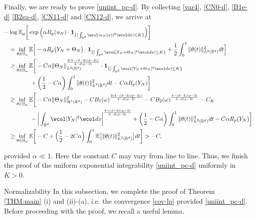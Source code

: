 \documentclass[%
11pt,  reqno]{amsart}
\makeatletter
\theoremstyle{remarkstyle}
\newcommand{\1}{\hspace{0.2mm}\text{I}\hspace{0.2mm}}
\newcommand{\noi}{\noindent}
\newcommand{\R}{\mathbb{R}}
\newcommand{\E}{\mathbb{E}}
\newcommand{\al}{\alpha}
\newcommand{\wick}[1]{\wcol#1\wcol}
\renewcommand{\o}{\omega}
\newcommand{\ind}{\mathbf 1}
\numberwithin{equation}{section}
\numberwithin{theorem}{section}
\def\subsubsection{\@startsection{subsubsection}{3}%
	\z@{.5\linespacing\@plus.7\linespacing}{-.5em}%
	{\normalfont\bfseries}}
\makeatother
\begin{document}
	
	Finally,
	we are ready to prove \eqref{uniint_pc-d}.
	By collecting \eqref{var4}, \eqref{CN0-d}, 
	\eqref{B1e-d}
	\eqref{B2ea-d},
	\eqref{CN11-d} and \eqref{CN12-d},
	we arrive at
	\begin{align}
		\label{CN13-d}
		\begin{split}
			- & \log  \E_{\mu}  \bigg[ \exp \Big(\al R_p(u_N) \cdot  \ind_{\{ | \int_{\R^d} \wick{|u_N (x)|^2} dx| \le K\}} \Big) \bigg] \\
			&= \inf_{\theta \in \mathbb{H}_a} \E \Big[ - \al R_p \big( Y_N+ \Theta_N \big) 
			\cdot  \ind_{\{ | \int_{\R^d} \wick{| Y_N  + \Theta_N|^2} dx|  \le K \}} + \frac12 \int_0^1 
			\| \theta (t) \|_{L^2(\R^d)}^2 dt  \Big] \\
			& \ge \inf_{\theta \in \mathbb{H}_a} \E \bigg[ - C \al  \|\Theta_N\|_{L^2(\R^d)}^{\frac{2(4-(d-2)(p-2))}{4-d(p-2)}} \cdot \ind_{\{ | \int_{\R^d} \wick{|Y_N + \Theta_N|^2} dx | \le K  \}} \\ 
			& \hphantom{XXXX} 
			+ \bigg( \frac12 - C \al \bigg) \int_0^1 \|\theta (t) \|_{L^2(\R^d)}^2 dt   - C  \al R_p(Y_N) \bigg]\\
			& \ge \inf_{\theta \in \mathbb{H}_a}  \E \bigg[  - C \al  \|\Theta_N\|_{\mathcal H^1(\R^d)}^2 - C   B_1(\o)^{\frac{2(4-(d-2)(p-2))}{4-d(p-2)}} - C B_2(\o)^{\frac{4-(d-2)(p-2)}{4-d(p-2)}} - C_K \\ 
			& \hphantom{XXXX}
			- \bigg| \int_{\R^d} \wick{ |Y_N |^2 } dx \bigg|^{\frac{4-(d-2)(p-2)}{4-d(p-2)}} 
			+  \bigg( \frac12 - C \al \bigg)   \int_0^1 
			\| \theta (t) \|_{L^2(\R^d)}^2 dt 
			- C\al  R_p(Y_N) \bigg]\\
			& \ge \inf_{\theta \in \mathbb{H}_a}  \E \bigg[  - C  +    \Big( \frac12 - 2 C \al \Big) \int_0^1 
			\E \big[ \| \theta (t) \|_{L^2(\R^d)}^2 \big] dt 
			\bigg] > -C,
		\end{split}
	\end{align}
	
	\noi 
	provided $\al \ll 1$.
	Here the constant $C$ may vary from line to line.
	Thus, we finish the proof of the uniform exponential integrability \eqref{uniint_pc-d} uniformly in $K > 0$.
	
	\subsubsection{Normalizability}
	\label{SUB:nor}
	In this subsection, we complete the proof of Theorem \ref{THM:main} (i) and (ii)-(a), i.e. the convergence \eqref{cov-lp} provided \eqref{uniint_pc-d}.
	Before proceeding with the proof, we recall a useful lemma.
	
\end{document}
